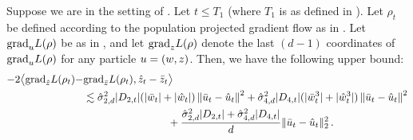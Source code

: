 \begin{lemma}\label{lemma:A_bound_other_coord}
Suppose we are in the setting of . Let $t \leq T_1$ (where $T_1$ is as defined in ). Let $\rho_t$ be defined according to the population projected gradient flow as in . Let ${\textup{grad}}_u L(\rho)$ be as in , and let ${\textup{grad}}_z L(\rho)$ denote the last $(d - 1)$ coordinates of ${\textup{grad}}_u L(\rho)$ for any particle $u = (w, z)$. Then, we have the following upper bound:
\begin{align}
-2 \big\langle {\textup{grad}}_{\hat{z}} L(\rho_t) - & {\textup{grad}}_{\bar{z}} L(\rho_t), \hat{z}_t - \bar{z}_t\big\rangle \\
& \lesssim \hat{\sigma}_{2, d}^2|D_{2,t}| (|\bar{w}_t| + |\hat{w}_t|) \left\lVert\bar{u}_t-\hat{u}_t\right\rVert^2 + \hat{\sigma}_{4, d}^2|D_{4,t}|(|\bar{w}_t^3| + |\hat{w}_t^3|) \left\lVert\bar{u}_t-\hat{u}_t\right\rVert^2 \\ 
&\,\,\,\,\,\,\,\,\,\,\,\,\,\,\,\,\,\,\,\,\,\,\,\,\,\,\,\,\,\,\,\,\,\,\,\,\,\,\,\,\,\,\,\,\,\,\,\, + \frac{\hat{\sigma}_{2, d}^2 |D_{2, t}| + \hat{\sigma}_{4, d}^2 |D_{4, t}|}{d} \|\bar{u}_t - \hat{u}_t\|_2^2 \,.
\end{align}
\end{lemma}
